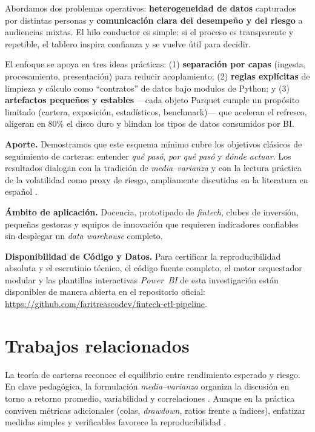 \documentclass[conference]{IEEEtran}
\begin{document}
Abordamos dos problemas operativos: \textbf{heterogeneidad de datos} capturados por distintas personas y \textbf{comunicación clara del desempeño y del riesgo} a audiencias mixtas. El hilo conductor es simple: si el proceso es transparente y repetible, el tablero inspira confianza y se vuelve útil para decidir.

El enfoque se apoya en tres ideas prácticas: (1) \textbf{separación por capas} (ingesta, procesamiento, presentación) para reducir acoplamiento; (2) \textbf{reglas explícitas} de limpieza y cálculo como “contratos” de datos bajo modulos de Python; y (3) \textbf{artefactos pequeños y estables} —cada objeto Parquet cumple un propósito limitado (cartera, exposición, estadísticos, benchmark)— que aceleran el refresco, aligeran en $80\%$ el disco duro y blindan los tipos de datos consumidos por BI.

\textbf{Aporte.} Demostramos que este esquema mínimo cubre los objetivos clásicos de seguimiento de carteras: entender \emph{qué pasó}, \emph{por qué pasó} y \emph{dónde actuar}. Los resultados dialogan con la tradición de \emph{media--varianza} y con la lectura práctica de la volatilidad como proxy de riesgo, ampliamente discutidas en la literatura en español \cite{zapata2022,macias2020,ramirez2016,barbosa2019,gaona2020,novoa2019}.

\textbf{Ámbito de aplicación.} Docencia, prototipado de \emph{fintech}, clubes de inversión, pequeñas gestoras y equipos de innovación que requieren indicadores confiables sin desplegar un \emph{data warehouse} completo.

\textbf{Disponibilidad de Código y Datos.} Para certificar la reproducibilidad absoluta y el escrutinio técnico, el código fuente completo, el motor orquestador modular y las plantillas interactivas \emph{Power~BI} de esta investigación están disponibles de manera abierta en el repositorio oficial: \url{https://github.com/faritreascodev/fintech-etl-pipeline}.
\section{Trabajos relacionados}
La teoría de carteras reconoce el equilibrio entre rendimiento esperado y riesgo. En clave pedagógica, la formulación \emph{media--varianza} organiza la discusión en torno a retorno promedio, variabilidad y correlaciones \cite{zapata2022,macias2020}. Aunque en la práctica conviven métricas adicionales (colas, \emph{drawdown}, ratios frente a índices), enfatizar medidas simples y verificables favorece la reproducibilidad \cite{ramirez2016}.
\end{document}

